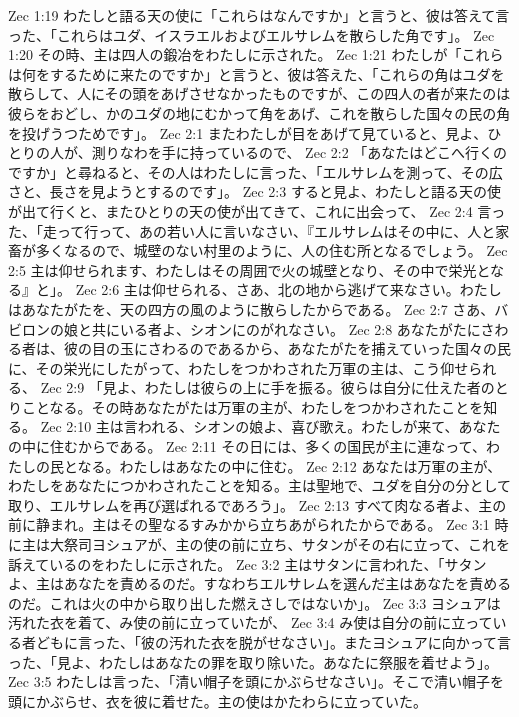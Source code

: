 Zec 1:19  わたしと語る天の使に「これらはなんですか」と言うと、彼は答えて言った、「これらはユダ、イスラエルおよびエルサレムを散らした角です」。
Zec 1:20  その時、主は四人の鍛冶をわたしに示された。
Zec 1:21  わたしが「これらは何をするために来たのですか」と言うと、彼は答えた、「これらの角はユダを散らして、人にその頭をあげさせなかったものですが、この四人の者が来たのは彼らをおどし、かのユダの地にむかって角をあげ、これを散らした国々の民の角を投げうつためです」。
Zec 2:1  またわたしが目をあげて見ていると、見よ、ひとりの人が、測りなわを手に持っているので、
Zec 2:2  「あなたはどこへ行くのですか」と尋ねると、その人はわたしに言った、「エルサレムを測って、その広さと、長さを見ようとするのです」。
Zec 2:3  すると見よ、わたしと語る天の使が出て行くと、またひとりの天の使が出てきて、これに出会って、
Zec 2:4  言った、「走って行って、あの若い人に言いなさい、『エルサレムはその中に、人と家畜が多くなるので、城壁のない村里のように、人の住む所となるでしょう。
Zec 2:5  主は仰せられます、わたしはその周囲で火の城壁となり、その中で栄光となる』と」。
Zec 2:6  主は仰せられる、さあ、北の地から逃げて来なさい。わたしはあなたがたを、天の四方の風のように散らしたからである。
Zec 2:7  さあ、バビロンの娘と共にいる者よ、シオンにのがれなさい。
Zec 2:8  あなたがたにさわる者は、彼の目の玉にさわるのであるから、あなたがたを捕えていった国々の民に、その栄光にしたがって、わたしをつかわされた万軍の主は、こう仰せられる、
Zec 2:9  「見よ、わたしは彼らの上に手を振る。彼らは自分に仕えた者のとりことなる。その時あなたがたは万軍の主が、わたしをつかわされたことを知る。
Zec 2:10  主は言われる、シオンの娘よ、喜び歌え。わたしが来て、あなたの中に住むからである。
Zec 2:11  その日には、多くの国民が主に連なって、わたしの民となる。わたしはあなたの中に住む。
Zec 2:12  あなたは万軍の主が、わたしをあなたにつかわされたことを知る。主は聖地で、ユダを自分の分として取り、エルサレムを再び選ばれるであろう」。
Zec 2:13  すべて肉なる者よ、主の前に静まれ。主はその聖なるすみかから立ちあがられたからである。
Zec 3:1  時に主は大祭司ヨシュアが、主の使の前に立ち、サタンがその右に立って、これを訴えているのをわたしに示された。
Zec 3:2  主はサタンに言われた、「サタンよ、主はあなたを責めるのだ。すなわちエルサレムを選んだ主はあなたを責めるのだ。これは火の中から取り出した燃えさしではないか」。
Zec 3:3  ヨシュアは汚れた衣を着て、み使の前に立っていたが、
Zec 3:4  み使は自分の前に立っている者どもに言った、「彼の汚れた衣を脱がせなさい」。またヨシュアに向かって言った、「見よ、わたしはあなたの罪を取り除いた。あなたに祭服を着せよう」。
Zec 3:5  わたしは言った、「清い帽子を頭にかぶらせなさい」。そこで清い帽子を頭にかぶらせ、衣を彼に着せた。主の使はかたわらに立っていた。
